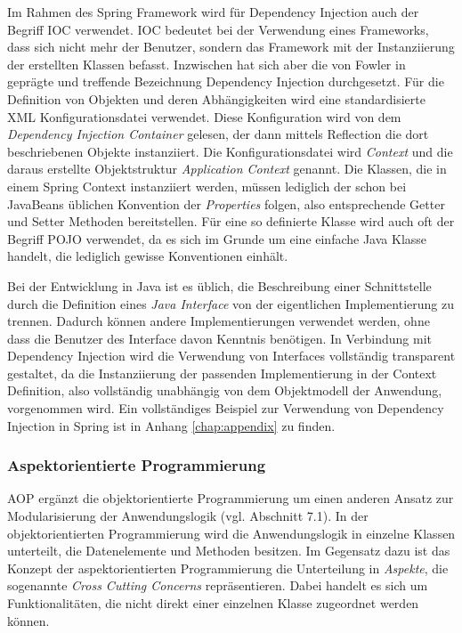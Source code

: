 Im Rahmen des Spring Framework wird für Dependency Injection auch der Begriff
\ac{IOC} verwendet. \ac{IOC} bedeutet bei der Verwendung eines Frameworks, dass
sich nicht mehr der Benutzer, sondern das Framework mit der Instanziierung der
erstellten Klassen befasst. Inzwischen hat sich aber die von Fowler in
\cite{fowler:2004} geprägte und treffende Bezeichnung Dependency Injection
durchgesetzt. Für die Definition von Objekten und deren Abhängigkeiten wird eine
standardisierte \ac{XML} Konfigurationsdatei verwendet. Diese Konfiguration wird
von dem \emph{Dependency Injection Container} gelesen, der dann mittels
Reflection die dort beschriebenen Objekte instanziiert. Die Konfigurationsdatei
wird
\emph{Context} und die daraus erstellte Objektstruktur \emph{Application Context}
genannt. Die Klassen, die in einem Spring Context instanziiert werden, müssen
lediglich der schon bei JavaBeans üblichen Konvention der \emph{Properties}
folgen, also entsprechende Getter und Setter Methoden bereitstellen. Für eine so
definierte Klasse wird auch oft der Begriff \ac{POJO} verwendet, da es sich im
Grunde um eine einfache Java Klasse handelt, die lediglich gewisse Konventionen
einhält.

Bei der Entwicklung in Java ist es üblich, die Beschreibung einer Schnittstelle
durch die Definition eines \emph{Java Interface} von der eigentlichen
Implementierung zu trennen. Dadurch können andere Implementierungen verwendet
werden, ohne dass die Benutzer des Interface davon Kenntnis benötigen. In
Verbindung mit Dependency Injection wird die Verwendung von Interfaces
vollständig transparent gestaltet, da die Instanziierung der passenden
Implementierung in der Context Definition, also vollständig unabhängig von dem
Objektmodell der Anwendung, vorgenommen wird. Ein vollständiges Beispiel zur
Verwendung von Dependency Injection in Spring ist in Anhang \ref{chap:appendix}
zu finden.

\subsubsection{Aspektorientierte Programmierung}\label{define:aop}
\ac{AOP} ergänzt die objektorientierte Programmierung um einen anderen Ansatz zur
Modularisierung der Anwendungslogik (vgl. \cite{spring:reference} Abschnitt 7.1).
In der objektorientierten Programmierung wird die Anwendungslogik in einzelne
Klassen unterteilt, die Datenelemente und Methoden besitzen. Im Gegensatz dazu
ist das Konzept der aspektorientierten Programmierung die Unterteilung in
\emph{Aspekte}, die sogenannte \emph{Cross Cutting Concerns} repräsentieren.
Dabei handelt es sich um Funktionalitäten, die nicht direkt einer einzelnen
Klasse zugeordnet werden können.

